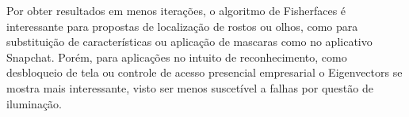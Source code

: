 Por obter resultados em menos iterações, o algoritmo de Fisherfaces é interessante para propostas de localização de rostos ou olhos, como para substituição de características ou aplicação de mascaras como no aplicativo Snapchat. Porém, para aplicações no intuito de reconhecimento, como desbloqueio de tela ou controle de acesso presencial empresarial o Eigenvectors se mostra mais interessante, visto ser menos suscetível a falhas por questão de iluminação.

